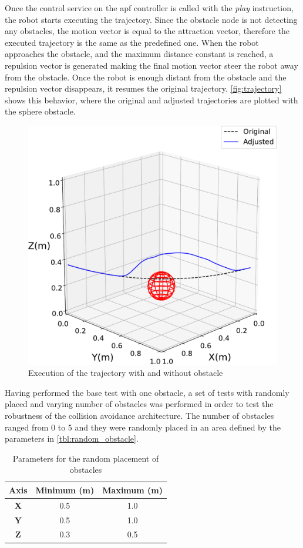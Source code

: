\par Once the control service on the \ac{apf} controller is called with the \textit{play} instruction, the robot starts executing the trajectory. Since the obstacle node is not detecting any obstacles, the motion vector is equal to the attraction vector, therefore the executed trajectory is the same as the predefined one. When the robot approaches the obstacle, and the maximum distance constant is reached, a repulsion vector is generated making the final motion vector steer the robot away from the obstacle. Once the robot is enough distant from the obstacle and the repulsion vector disappears, it resumes the original trajectory. \autoref{fig:trajectory} shows this behavior, where the original and adjusted trajectories are plotted with the sphere obstacle.

\begin{figure}[h]
    \centering
    \includegraphics[width=0.6\linewidth]{figs/chp6/trajectory_3d.pdf}
    \caption{Execution of the trajectory with and without obstacle}
    \label{fig:trajectory}
\end{figure}

\par Having performed the base test with one obstacle, a set of tests with randomly placed and varying number of obstacles was performed in order to test the robustness of the collision avoidance architecture. The number of obstacles ranged from 0 to 5 and they were randomly placed in an area defined by the parameters in \autoref{tbl:random_obstacle}.

\begin{table}[h]
    \centering
    \begin{tabular}{|c|c|c|}
    \hline
    \textbf{Axis} & \textbf{Minimum} (m) & \textbf{Maximum} (m) \\ \hline
    \textbf{X} & 0.5 & 1.0 \\ \hline
    \textbf{Y} & 0.5 & 1.0 \\ \hline
    \textbf{Z} & 0.3 & 0.5 \\ \hline
    \end{tabular}
    \caption{Parameters for the random placement of obstacles}
    \label{tbl:random_obstacle}
\end{table}

